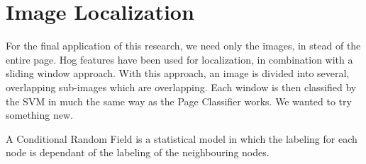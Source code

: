 \section{Image Localization}
\label{sec:imageloc}

For the final application of this research, we need only the images, in stead of
the entire page. Hog features have been used for localization, in combination
with a sliding window approach\cite{harzallah2009combining,
suard2006pedestrian}. With this approach, an image is divided into several,
overlapping sub-images which are overlapping. Each window is then classified by
the SVM in much the same way as the Page Classifier works. We wanted to try
something new.

A Conditional Random Field \cite{lafferty2001conditional} is a statistical model
in which the labeling for each node is dependant of the labeling of the
neighbouring nodes.
